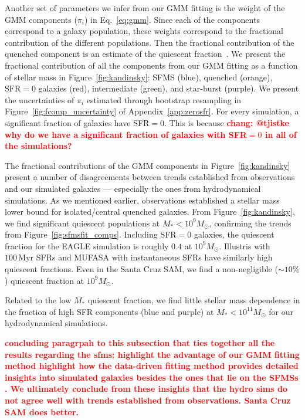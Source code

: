\documentclass[preprint2,tighten]{aastex62}
\newcommand{\todo}[1]{{\bf \textcolor{red}{ #1}}}
\begin{document}
Another set of parameters we infer from our GMM fitting is the weight of the 
GMM components ($\pi_i$) in Eq.~\ref{eq:gmm}. Since each of the components 
correspond to a galaxy population, these weights correspond to the fractional
contribution of the different populations. Then the fractional contribution 
of the quenched component is an estimate of the quiescent 
fraction~\citep[\emph{e.g.}][]{blanton2009, geha2012,hahn2015}. We present 
the fractional contribution of all the components from our GMM fitting as a
function of stellar mass in Figure~\ref{fig:kandinsky}: SFMS (blue), 
quenched (orange), $\mathrm{SFR}=0$ galaxies (red), intermediate (green), 
and star-burst (purple). We present the uncertainties of $\pi_i$ estimated
through bootstrap resampling in Figure~\ref{fig:fcomp_uncertainty} of 
Appendix~\ref{app:zerosfr}. 
For every simulation, a significant fraction of galaxies have SFR$=0$. 
This is because \todo{chang: @tjistke why do we have a significant fraction 
of galaxies with SFR$=0$ in all of the simulations?} 

The fractional contributions of the GMM components in Figure~\ref{fig:kandinsky}
present a number of disagreements between trends established from 
observations and our simulated galaxies --- especially the ones from 
hydrodynamical simulations. As we mentioned earlier, observations 
established a stellar mass lower bound for isolated/central quenched
galaxies. From Figure~\ref{fig:kandinsky}, we find significant quiescent
populations at $M_* < 10^9 M_\odot$, confirming the trends from 
Figure~\ref{fig:sfmsfit_comps}. Including SFR$=0$ galaxies, the quiescent 
fraction for the EAGLE simulation is roughly $0.4$ at $10^9M_\odot$. 
Illustris with $100\,\mathrm{Myr}$ SFRs and MUFASA with instantaneous SFRs
have similarly high quiescent fractions. Even in the Santa Cruz SAM, we 
find a non-negligible ($\sim 10\%$) quiescent fraction at $10^9M_\odot$. 

Related to the low $M_*$ quiescent fraction, we find little stellar mass 
dependence in the fraction of high SFR components (blue and purple) at 
$M_* < 10^{11} M_\odot$ for our hydrodynamical simulations. 

\todo{concluding paragrpah to this subsection that ties together all the
results regarding the sfms: 
highlight the advantage of our GMM fitting method
highlight how the data-driven fitting method provides detailed insights into 
simulated galaxies besides the ones that lie on the SFMSs .
We ultimately conclude from these insights that the hydro sims do not agree
well with trends established from observations. Santa Cruz SAM does better.}
\end{document}

